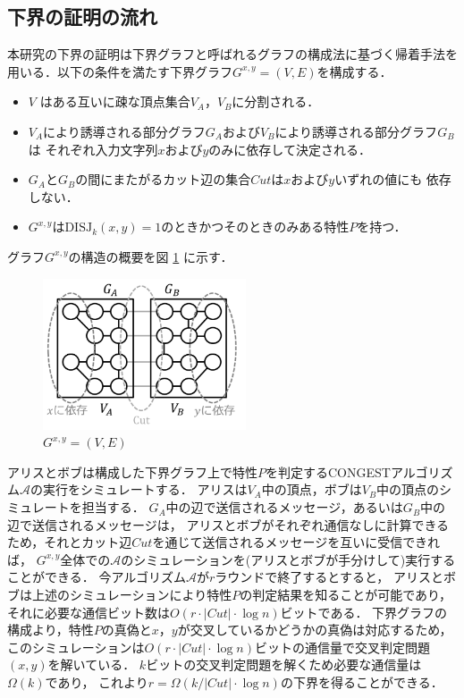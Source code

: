 \documentclass[a4j,twoside]{jarticle}
\newcommand{\CONGEST}{\textsf{CONGEST}}
\theoremstyle{definition}
\begin{document}
\begin{論文概要}
\section{下界の証明の流れ}
本研究の下界の証明は下界グラフと呼ばれるグラフの構成法に基づく帰着手法を用いる．以下の条件を満たす下界グラフ$G^{x,y}=(V, E)$を構成する．
\begin{itemize}
\item $V$ はある互いに疎な頂点集合$V_A$，$V_B$に分割される．
\item $V_A$により誘導される部分グラフ$G_A$および$V_B$により誘導される部分グラフ$G_B$は
それぞれ入力文字列$x$および$y$のみに依存して決定される．
\item $G_A$と$G_B$の間にまたがるカット辺の集合$\mathit{Cut}$は$x$および$y$いずれの値にも
依存しない．
\item $G^{x,y}$は$\mathrm{DISJ}_{k} (x, y)=1$のときかつそのときのみある特性$P$を持つ．
\end{itemize}
グラフ$G^{x, y}$の構造の概要を図 \ref{Gxy} に示す．
\begin{figure}[ht]
\begin{center}
\includegraphics[width=60mm]{Gxy.png}
\end{center}
\caption{$G^{x, y} = (V, E)$}
\label{Gxy}
\end{figure}

アリスとボブは構成した下界グラフ上で特性$P$を判定する{\CONGEST}アルゴリズム$\mathcal{A}$の実行をシミュレートする．
アリスは$V_{A}$中の頂点，ボブは$V_{B}$中の頂点のシミュレートを担当する．
$G_{A}$中の辺で送信されるメッセージ，あるいは$G_{B}$中の辺で送信されるメッセージは，
アリスとボブがそれぞれ通信なしに計算できるため，それとカット辺$\mathit{Cut}$を通じて送信されるメッセージを互いに受信できれば，
$G^{x,y}$全体での$\mathcal{A}$のシミュレーションを(アリスとボブが手分けして)実行することができる．
今アルゴリズム$\mathcal{A}$が$r$ラウンドで終了するとすると，
アリスとボブは上述のシミュレーションにより特性$P$の判定結果を知ることが可能であり，
それに必要な通信ビット数は$O(r \cdot |\mathit{Cut}| \cdot \log n)$ビットである．
下界グラフの構成より，特性$P$の真偽と$x$，$y$が交叉しているかどうかの真偽は対応するため，
このシミュレーションは$O(r \cdot |\mathit{Cut}| \cdot \log n)$ビットの通信量で交叉判定問題$(x,y)$を解いている．
$k$ビットの交叉判定問題を解くため必要な通信量は$\Omega(k)$であり，
これより$r = \Omega (k / |\mathit{Cut}| \cdot \log n)$の下界を得ることができる．


\end{論文概要}
\end{document}
